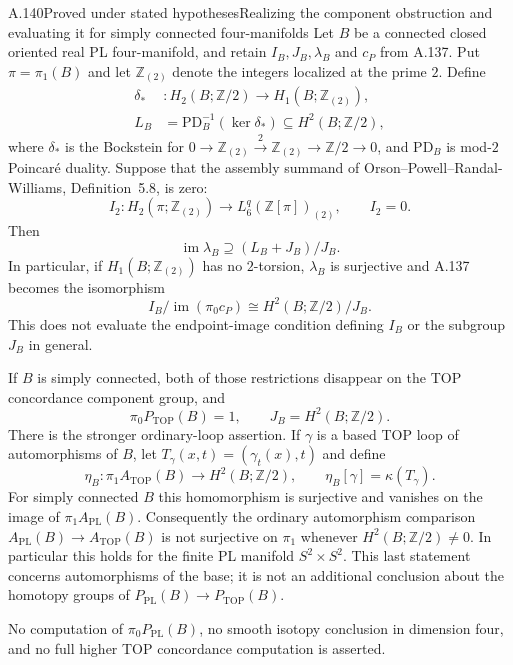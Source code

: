\begin{saresult}{A.140}{Proved under stated hypotheses}{Realizing the component obstruction and evaluating it for simply connected four-manifolds}
Let $B$ be a connected closed oriented real PL four-manifold, and
retain $I_B,J_B,\lambda_B$ and $c_P$ from A.137. Put
$\pi=\pi_1(B)$ and let $\mathbb Z_{(2)}$ denote the integers
localized at the prime $2$. Define
\[
 \begin{split}
 \delta_* &: H_2(B;\mathbb Z/2)\longrightarrow
                         H_1(B;\mathbb Z_{(2)}),\\
 L_B&=\mathrm{PD}_B^{-1}(\ker\delta_*)
                      \subseteq H^2(B;\mathbb Z/2),
 \end{split}                                             \tag{A.140.1}
\]
where $\delta_*$ is the Bockstein for
$0\to\mathbb Z_{(2)}\xrightarrow{2}\mathbb Z_{(2)}
\to\mathbb Z/2\to0$, and $\mathrm{PD}_B$ is mod-$2$
Poincar\'e duality. Suppose that the assembly summand of
Orson--Powell--Randal-Williams, Definition~5.8, is zero:
\[
 I_2:H_2(\pi;\mathbb Z_{(2)})
       \longrightarrow L^q_6(\mathbb Z[\pi])_{(2)},
 \qquad I_2=0.                                          \tag{A.140.2}
\]
Then
\[
 \operatorname{im}\lambda_B
       \supseteq (L_B+J_B)/J_B.                          \tag{A.140.3}
\]
In particular, if $H_1(B;\mathbb Z_{(2)})$ has no $2$-torsion,
$\lambda_B$ is surjective and A.137 becomes the isomorphism
\[
 I_B/\operatorname{im}(\pi_0c_P)
          \cong H^2(B;\mathbb Z/2)/J_B.                 \tag{A.140.4}
\]
This does not evaluate the endpoint-image condition defining $I_B$
or the subgroup $J_B$ in general.

If $B$ is simply connected, both of those restrictions disappear
on the TOP concordance component group, and
\[
       \pi_0P_{\mathrm{TOP}}(B)=1,
       \qquad J_B=H^2(B;\mathbb Z/2).                   \tag{A.140.5}
\]
There is the stronger ordinary-loop assertion. If $\gamma$ is a
based TOP loop of automorphisms of $B$, let
$T_\gamma(x,t)=(\gamma_t(x),t)$ and define
\[
 \eta_B:\pi_1 A_{\mathrm{TOP}}(B)\longrightarrow
                  H^2(B;\mathbb Z/2),
 \qquad \eta_B[\gamma]=\kappa(T_\gamma).                \tag{A.140.6}
\]
For simply connected $B$ this homomorphism is surjective and
vanishes on the image of $\pi_1A_{\mathrm{PL}}(B)$.
Consequently the ordinary automorphism comparison
$A_{\mathrm{PL}}(B)\to A_{\mathrm{TOP}}(B)$ is not surjective
on $\pi_1$ whenever $H^2(B;\mathbb Z/2)\ne0$. In particular
this holds for the finite PL manifold $S^2\times S^2$.
This last statement concerns automorphisms of the base; it is
not an additional conclusion about the homotopy groups of
$P_{\mathrm{PL}}(B)\to P_{\mathrm{TOP}}(B)$.

No computation of $\pi_0P_{\mathrm{PL}}(B)$, no smooth isotopy
conclusion in dimension four, and no full higher TOP concordance
computation is asserted.
\end{saresult}
